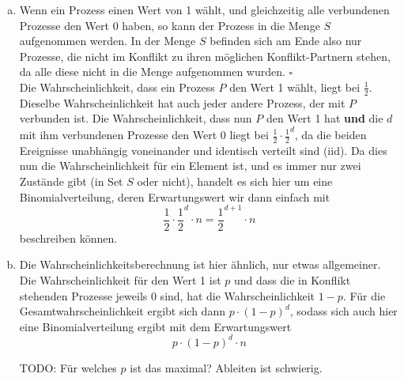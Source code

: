 \documentclass[12pt,a4paper]{article}
\begin{document}
\begin{enumerate}[a)]
	\item Wenn ein Prozess einen Wert von 1 wählt, und gleichzeitig alle verbundenen Prozesse den Wert 0 haben, so kann der Prozess in die Menge $S$ aufgenommen werden. In der Menge $S$ befinden sich am Ende also nur Prozesse, die nicht im Konflikt zu ihren möglichen Konflikt-Partnern stehen, da alle diese nicht in die Menge aufgenommen wurden. $\square$\\
		Die Wahrscheinlichkeit, dass ein Prozess $P$ den Wert 1 wählt, liegt bei $\frac{1}{2}$. Dieselbe Wahrscheinlichkeit hat auch jeder andere Prozess, der mit $P$ verbunden ist. Die Wahrscheinlichkeit, dass nun $P$ den Wert 1 hat \textbf{und} die $d$ mit ihm verbundenen Prozesse den Wert 0 liegt bei $\frac{1}{2} \cdot \frac{1}{2}^d$, da die beiden Ereignisse unabhängig voneinander und identisch verteilt sind (iid). Da dies nun die Wahrscheinlichkeit für ein Element ist, und es immer nur zwei Zustände gibt (in Set $S$ oder nicht), handelt es sich hier um eine Binomialverteilung, deren Erwartungswert wir dann einfach mit
		$$\frac{1}{2} \cdot \frac{1}{2}^d \cdot n = \frac{1}{2}^{d+1} \cdot n$$
		beschreiben können.

	\item Die Wahrscheinlichkeitsberechnung ist hier ähnlich, nur etwas allgemeiner. Die Wahrscheinlichkeit für den Wert 1 ist $p$ und dass die in Konflikt stehenden Prozesse jeweils 0 sind, hat die Wahrscheinlichkeit $1-p$. Für die Gesamtwahrscheinlichkeit ergibt sich dann $p \cdot (1-p)^d$, sodass sich auch hier eine Binomialverteilung ergibt mit dem Erwartungswert
		$$p \cdot (1-p)^d \cdot n$$
		
		TODO: Für welches $p$ ist das maximal? Ableiten ist schwierig.
		
\end{enumerate}
\end{document}
